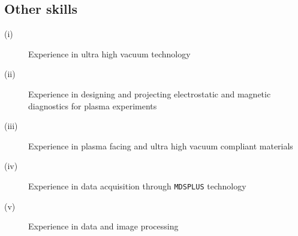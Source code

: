 \subsection{Other skills}
\begin{description}
\item[(i)] Experience in ultra high vacuum technology
\item[(ii)] Experience in designing and projecting electrostatic and
  magnetic diagnostics for plasma experiments
\item[(iii)] Experience in plasma facing and ultra high
  vacuum compliant materials
\item[(iv)] Experience in data acquisition through \texttt{MDSPLUS} technology
\item[(v)] Experience in data and image processing
\end{description}
